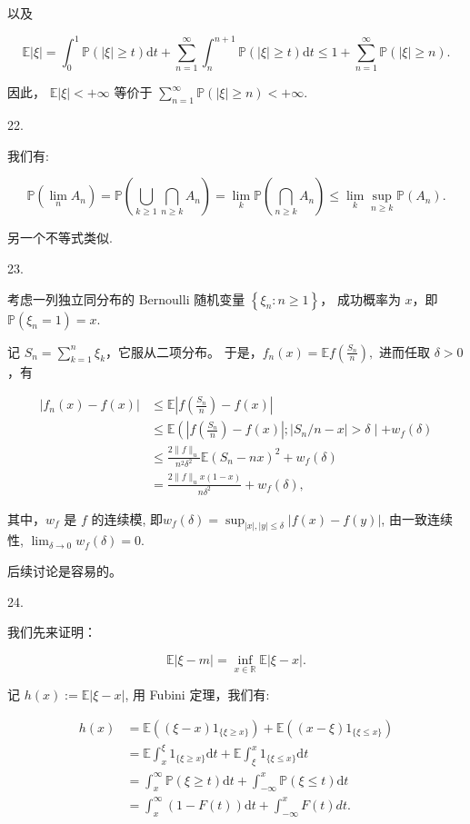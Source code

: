 以及

$$\mathbb{E}|\xi|=\int_{0}^{1} \mathbb{P}(|\xi| \geq t) \mathrm{d} t + \sum_{n=1}^{\infty} \int_{n}^{n+1} \mathbb{P}(|\xi| \geq t) \mathrm{d} t \leq 1+\sum_{n=1}^{\infty} \mathbb{P}(|\xi| \geq n) .$$

因此，  $\mathbb{E}|\xi|<+\infty $ 等价于  $\sum_{n=1}^{\infty} \mathbb{P}(|\xi| \geq n)<+\infty$.

22.

我们有:

 $$\mathbb{P}(\lim_{n} A_{n})= \mathbb{P}\left(\bigcup_{k \geq 1} \bigcap_{n \geq k} A_{n}\right)=\lim_{k} \mathbb{P}\left(\bigcap_{n \geq k} A_{n}\right) \leq \lim_k \sup_{n \geq k} \mathbb{P}\left(A_{n}\right). $$

另一个不等式类似.

23.

考虑一列独立同分布的 Bernoulli 随机变量  $\left\{\xi_{n}: n \geq 1\right\}$，
成功概率为 $x$，即  $\mathbb{P}(\xi_{n}=1)=x$.

记  $\displaystyle S_{n}=\sum_{k=1}^{n} \xi_{k}$，它服从二项分布。
于是，$f_{n}(x)=\mathbb{E} f\left(\frac{S_{n}}{n}\right),$
进而任取  $\delta>0  $，有

\begin{align}
\left|f_{n}(x)-f(x)\right| & \leq \mathbb{E}\left|f\left(\frac{S_{n}}{n}\right)-f(x)\right| \\
& \leq \mathbb{E}\left(\left|f\left(\frac{S_{n}}{n}\right)-f(x)\right| ;\left|S_{n} / n-x\right|>\delta \mid+w_{f}(\delta)\right. \\
& \leq \frac{2\|f\|_{u}}{n^{2} \delta^{2}} \mathbb{E}\left(S_{n}-n x\right)^{2}+w_{f}(\delta) \\
& =\frac{2\|f\|_{u} x(1-x)}{n \delta^{2}}+w_{f}(\delta),
\end{align}

其中，$w_{f}$ 是 $f$ 的连续模, 即$w_f(\delta) = \sup_{|x|,|y|\leq \delta} |f(x) - f(y)|$,
由一致连续性, $\displaystyle \lim_{\delta \to 0} w_f(\delta) = 0$.

后续讨论是容易的。

24.

我们先来证明：

$$\mathbb{E}|\xi-m|=\inf_{x \in \mathbb{R}} \mathbb{E}|\xi-x|.$$

记  $h(x):=\mathbb{E}|\xi-x|$, 用 Fubini 定理，我们有:

\begin{align}
h(x) & =\mathbb{E}\left((\xi-x) 1_{\{\xi \geq x\}}\right)+\mathbb{E}\left((x-\xi) 1_{\{\xi \leq x\}}\right) \\
& =\mathbb{E} \int_{x}^{\xi} 1_{\{\xi \geq x\}} \mathrm{d} t+\mathbb{E} \int_{\xi}^{x} 1_{\{\xi \leq x\}} \mathrm{d} t \\
& =\int_{x}^{\infty} \mathbb{P}(\xi \geq t) \mathrm{d} t+\int_{-\infty}^{x} \mathbb{P}(\xi \leq t) \mathrm{d} t \\
& =\int_{x}^{\infty}(1-F(t)) \mathrm{d} t+\int_{-\infty}^{x} F(t) d t .
\end{align}

